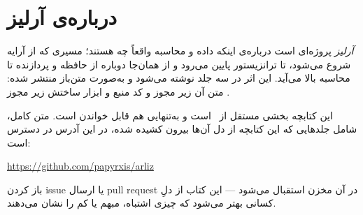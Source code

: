 \chapter*{درباره‌ی آرلیز}

\textit{آرلیز} پروژه‌ای است درباره‌ی اینکه داده و محاسبه واقعاً چه
هستند؛ مسیری که از آرایه شروع می‌شود، تا ترانزیستور پایین می‌رود و
از همان‌جا دوباره از حافظه و پردازنده تا محاسبه بالا می‌آید. این اثر
در سه جلد نوشته می‌شود و به‌صورت متن‌باز منتشر شده: متن آن زیر مجوز
 و کد منبع و ابزار ساختش زیر مجوز .

این کتابچه بخشی مستقل از \BookletSubtitle\ است و به‌تنهایی هم قابل
خواندن است. متن کامل، شامل جلدهایی که این کتابچه از دل آن‌ها بیرون
کشیده شده، در این آدرس در دسترس است:

\begin{center}
  \url{https://github.com/papyrxis/arliz}
\end{center}

باز کردن issue یا ارسال pull request در آن مخزن استقبال می‌شود ---
این کتاب از دلِ کسانی بهتر می‌شود که چیزی اشتباه، مبهم یا کم را
نشان می‌دهند.